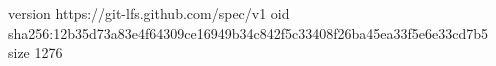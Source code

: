 version https://git-lfs.github.com/spec/v1
oid sha256:12b35d73a83e4f64309ce16949b34c842f5c33408f26ba45ea33f5e6e33cd7b5
size 1276
